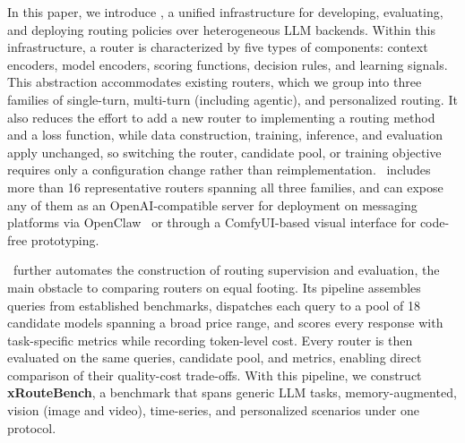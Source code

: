 In this paper, we introduce \textbf{\method}, a unified infrastructure for developing, evaluating, and deploying routing policies over heterogeneous LLM backends. Within this infrastructure, a router is characterized by five types of components: context encoders, model encoders, scoring functions, decision rules, and learning signals. This abstraction accommodates existing routers, which we group into three families of single-turn, multi-turn (including agentic), and personalized routing. It also reduces the effort to add a new router to implementing a routing method and a loss function, while data construction, training, inference, and evaluation apply unchanged, so switching the router, candidate pool, or training objective requires only a configuration change rather than reimplementation. \method\ includes more than 16 representative routers spanning all three families, and can expose any of them as an OpenAI-compatible server for deployment on messaging platforms via OpenClaw~\citep{openclaw2026} or through a ComfyUI-based visual interface for code-free prototyping.

\method\ further automates the construction of routing supervision and evaluation, the main obstacle to comparing routers on equal footing. Its pipeline assembles queries from established benchmarks, dispatches each query to a pool of 18 candidate models spanning a broad price range, and scores every response with task-specific metrics while recording token-level cost. Every router is then evaluated on the same queries, candidate pool, and metrics, enabling direct comparison of their quality-cost trade-offs. With this pipeline, we construct \textbf{xRouteBench}, a benchmark that spans generic LLM tasks, memory-augmented, vision (image and video), time-series, and personalized scenarios under one protocol.




